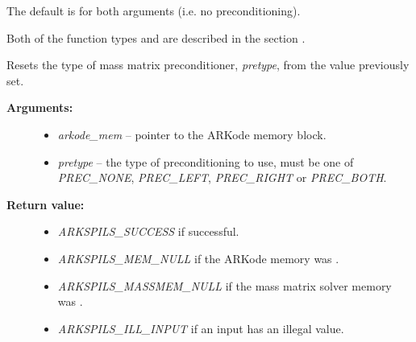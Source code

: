 \documentclass[letterpaper,10pt,english]{sphinxmanual}
\begin{document}
\begin{fulllineitems}
The default is  for both arguments (i.e. no
preconditioning).

Both of the function types {\hyperref[c_interface/User_supplied:c.ARKSpilsMassPrecSetupFn]{\emph{}}} and
{\hyperref[c_interface/User_supplied:c.ARKSpilsMassPrecSolveFn]{\emph{}}} are described in the section
{\hyperref[c_interface/User_supplied:cinterface-usersupplied]{\emph{}}}.

\end{fulllineitems}


\begin{fulllineitems}
\label{c_interface/User_callable:c.ARKSpilsSetMassPrecType}
Resets the type of mass matrix preconditioner, \emph{pretype}, from the value previously set.
\begin{description}
\item[{\textbf{Arguments:}}] \leavevmode\begin{itemize}
\item {} 
\emph{arkode\_mem} -- pointer to the ARKode memory block.

\item {} 
\emph{pretype} -- the type of preconditioning to use, must be one of
\emph{PREC\_NONE}, \emph{PREC\_LEFT}, \emph{PREC\_RIGHT} or \emph{PREC\_BOTH}.

\end{itemize}

\item[{\textbf{Return value:}}] \leavevmode\begin{itemize}
\item {} 
\emph{ARKSPILS\_SUCCESS} if successful.

\item {} 
\emph{ARKSPILS\_MEM\_NULL} if the ARKode memory was .

\item {} 
\emph{ARKSPILS\_MASSMEM\_NULL} if the mass matrix solver memory was .

\item {} 
\emph{ARKSPILS\_ILL\_INPUT} if an input has an illegal value.

\end{itemize}

\end{description}


\end{fulllineitems}
\end{document}
